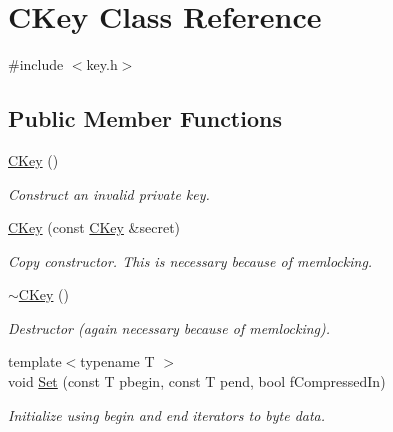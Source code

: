 \hypertarget{class_c_key}{}\section{C\+Key Class Reference}
\label{class_c_key}


{\ttfamily \#include $<$key.\+h$>$}

\subsection*{Public Member Functions}
\begin{DoxyCompactItemize}
\item 
\mbox{\label{class_c_key_a8f4ca910c7b7e729a3f2a5c59d060d3d}} 
\mbox{\hyperlink{class_c_key_a8f4ca910c7b7e729a3f2a5c59d060d3d}{C\+Key}} ()
\begin{DoxyCompactList}\small\item\em Construct an invalid private key. \end{DoxyCompactList}\item 
\mbox{\label{class_c_key_afcea34cefd25675f4cf9b03eaa4bb7d9}} 
\mbox{\hyperlink{class_c_key_afcea34cefd25675f4cf9b03eaa4bb7d9}{C\+Key}} (const \mbox{\hyperlink{class_c_key}{C\+Key}} \&secret)
\begin{DoxyCompactList}\small\item\em Copy constructor. This is necessary because of memlocking. \end{DoxyCompactList}\item 
\mbox{\label{class_c_key_a57d5b254748cef054c40f99c1c339147}} 
\mbox{\hyperlink{class_c_key_a57d5b254748cef054c40f99c1c339147}{$\sim$\+C\+Key}} ()
\begin{DoxyCompactList}\small\item\em Destructor (again necessary because of memlocking). \end{DoxyCompactList}\item 
\mbox{\label{class_c_key_aaa13d5f08456bba094210c5eeabf64c8}} 
{\footnotesize template$<$typename T $>$ }\\void \mbox{\hyperlink{class_c_key_aaa13d5f08456bba094210c5eeabf64c8}{Set}} (const T pbegin, const T pend, bool f\+Compressed\+In)
\begin{DoxyCompactList}\small\item\em Initialize using begin and end iterators to byte data. \end{DoxyCompactList}\item 

\end{DoxyCompactItemize}
